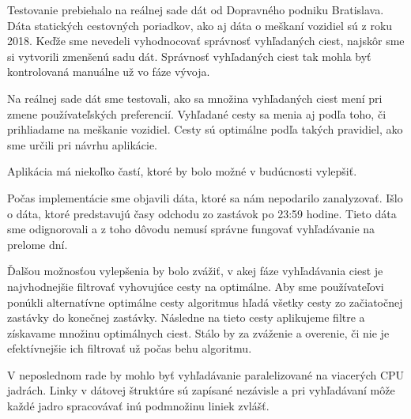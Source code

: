 Testovanie prebiehalo na reálnej sade dát od Dopravného podniku Bratislava. Dáta statických cestovných poriadkov, ako aj dáta o meškaní vozidiel sú z roku 2018. Keďže sme nevedeli vyhodnocovať správnosť vyhľadaných ciest, najskôr sme si vytvorili zmenšenú sadu dát. Správnosť vyhľadaných ciest tak mohla byť kontrolovaná manuálne už vo fáze vývoja. 

Na reálnej sade dát sme testovali, ako sa množina vyhľadaných ciest mení pri zmene používateľských preferencií. Vyhľadané cesty sa menia aj podľa toho, či prihliadame na meškanie vozidiel. Cesty sú optimálne podľa takých pravidiel, ako sme určili pri návrhu aplikácie. 

Aplikácia má niekoľko častí, ktoré by bolo možné v budúcnosti vylepšiť. 

Počas implementácie sme objavili dáta, ktoré sa nám nepodarilo zanalyzovať. Išlo o dáta, ktoré predstavujú časy odchodu zo zastávok po 23:59 hodine. Tieto dáta sme odignorovali a z toho dôvodu nemusí správne fungovať vyhľadávanie na prelome dní. 

Ďalšou možnosťou vylepšenia by bolo zvážiť, v akej fáze vyhľadávania ciest je najvhodnejšie filtrovať vyhovujúce cesty na optimálne. Aby sme používateľovi ponúkli alternatívne optimálne cesty algoritmus hľadá všetky cesty zo začiatočnej zastávky do konečnej zastávky. Následne na tieto cesty aplikujeme filtre a získavame množinu optimálnych ciest. Stálo by za zváženie a overenie, či nie je efektívnejšie ich filtrovať už počas behu algoritmu.

V neposlednom rade by mohlo byť vyhľadávanie paralelizované na viacerých CPU jadrách. Linky v dátovej štruktúre sú zapísané nezávisle a pri vyhľadávaní môže každé jadro spracovávať inú podmnožinu liniek zvlášť.

